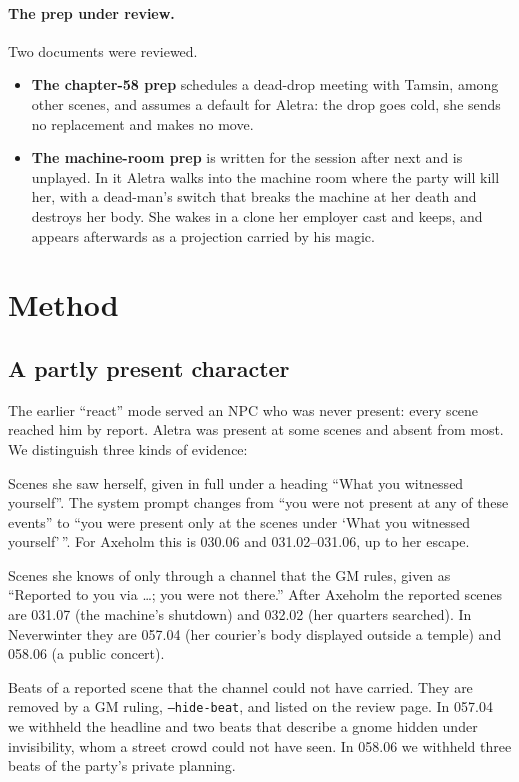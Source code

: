 \documentclass[11pt]{article}
\newcommand{\code}[1]{\texttt{#1}}
\begin{document}
\paragraph{The prep under review.} Two documents were reviewed.
\begin{itemize}[nosep]
\item \textbf{The chapter-58 prep} schedules a dead-drop meeting with Tamsin, among other
scenes, and assumes a default for Aletra: the drop goes cold, she sends no replacement and
makes no move.
\item \textbf{The machine-room prep} is written for the session after next and is
unplayed. In it Aletra walks into the machine room where the party will kill her, with a
dead-man's switch that breaks the machine at her death and destroys her body. She wakes in
a clone her employer cast and keeps, and appears afterwards as a projection carried by his
magic.
\end{itemize}

\section{Method}
\label{sec:method}

\subsection{A partly present character}
\label{sec:knowledge}

The earlier ``react'' mode served an NPC who was never present: every scene reached him by
report. Aletra was present at some scenes and absent from most. We distinguish three kinds
of evidence:

\begin{description}[nosep]
\item[Witnessed.] Scenes she saw herself, given in full under a heading ``What you
witnessed yourself''. The system prompt changes from ``you were not present at any of
these events'' to ``you were present only at the scenes under `What you witnessed
yourself'\,''. For Axeholm this is 030.06 and 031.02--031.06, up to her escape.
\item[Reported.] Scenes she knows of only through a channel that the GM rules, given as
``Reported to you via \ldots; you were not there.'' After Axeholm the reported scenes are
031.07 (the machine's shutdown) and 032.02 (her quarters searched). In Neverwinter they are
057.04 (her courier's body displayed outside a temple) and 058.06 (a public concert).
\item[Withheld.] Beats of a reported scene that the channel could not have carried. They
are removed by a GM ruling, \code{--hide-beat}, and listed on the review page. In 057.04 we
withheld the headline and two beats that describe a gnome hidden under invisibility, whom
a street crowd could not have seen. In 058.06 we withheld three beats of the party's private
planning.
\end{description}
\end{document}
